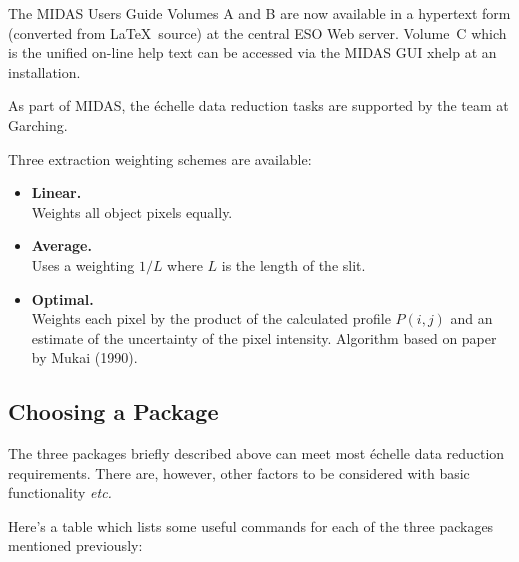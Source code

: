 \documentclass[twoside,11pt]{article}
\newcommand{\xlabel}[1]{}
\newcommand{\sgspec}[2]{#1}
\newcommand{\sgspec}[2]{#2}
\begin{document}
The MIDAS Users Guide Volumes A and B are now available in a hypertext
form (converted from \LaTeX\ source) at the central ESO Web server.
Volume~C which is the unified on-line help text can be accessed via the
MIDAS GUI xhelp at an installation.

As part of MIDAS, the \'{e}chelle data reduction tasks are supported by the
team at Garching.

Three extraction weighting schemes are available:

\begin{itemize}

\item {\bf{Linear.}} \mbox{}\\
      Weights all object pixels equally.

\item {\bf{Average.}} \mbox{}\\
      Uses a weighting $1/L$ where $L$ is the length of the slit.

\item {\bf{Optimal.}} \mbox{}\\
      Weights each pixel by the product of the calculated profile
      $P(i,j)$ and an estimate of the uncertainty of the pixel intensity.
      Algorithm based on paper by Mukai (1990)\@.

\end{itemize}


\subsection{\label{se_pack_sel}\xlabel{package_selection}Choosing a Package}

The three packages briefly described \sgspec{above}{previously} can meet
most \'{e}chelle data reduction requirements.  There are, however, other
factors to be considered with basic functionality {\em etc.}

Here's a table which lists some useful commands for each of the three
packages mentioned previously:
\end{document}
